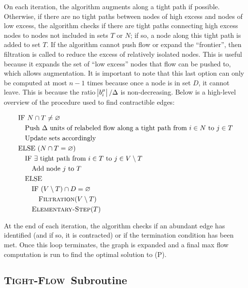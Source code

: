 \documentclass[11pt]{article}
\theoremstyle{definition}
\theoremstyle{definition}
\newcommand{\tf}{\textsc{Tight-Flow}}
\newcommand{\filtration}{\textsc{Filtration}}
\newcommand{\es}{\textsc{Elementary-Step}}
\newcommand{\todo}[1]{}%
\begin{document}
	On each iteration, the algorithm augments along a tight path if possible. Otherwise, if there
    are no tight paths between nodes of high excess and nodes of low excess, the algorithm checks
    if there are tight paths connecting high excess nodes to nodes not included in sets $T$ or $N$;
    if so, a node along this tight path is added to set $T$. If the algorithm cannot push flow
    or expand the ``frontier'', then filtration is called to reduce the excess of relatively
    isolated nodes. This is useful because it expands the set of ``low excess'' nodes that flow
    can be pushed to, which allows augmentation. It is important to note that this last option
    can only be computed at most $n - 1$ times because once a node is in set $D$, it cannot leave.
    This is because the ratio $\abs{b_i^\mu} / \Delta$ is non-decreasing. Below is a high-level
    overview of the procedure used to find contractible edges:
    \todo{Use algorithm package if time}
	\begin{align*}
	&\text{IF $N \cap T \neq \varnothing$} \\
	&\quad \text{Push $\Delta$ units of relabeled flow along a tight path from $i \in N$ to $j \in T$} \\ 
	&\quad \text{Update sets accordingly} \\
	&\text{ELSE ($N \cap T = \varnothing$)} \\
	&\quad \text{IF $\exists$ tight path from $i \in T$ to $j \in V \setminus T$} \\
	&\quad \quad \text{Add node $j$ to $T$} \\
	&\quad \text{ELSE} \\
	&\quad \quad \text{IF $(V \setminus T) \cap D = \varnothing$} \\
	&\quad \quad \quad \text{\filtration($V \setminus T$)} \\
	&\quad \quad \text{\es($T$)} 
	\end{align*}
	
	At the end of each iteration, the algorithm checks if an abundant edge has
    identified (and if so, it is contracted) or if the termination condition has been met.
    Once this loop terminates, the graph is expanded and a final max flow computation
    is run to find the optimal solution to (P).
	\subsection{\tf\ Subroutine}\label{sec:tf}
    
\end{document}
